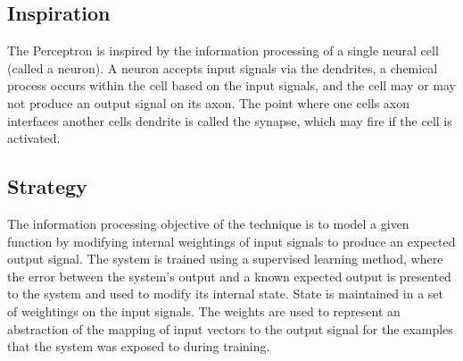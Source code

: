 \subsection{Inspiration}
The Perceptron is inspired by the information processing of a single neural cell (called a neuron). 
A neuron accepts input signals via the dendrites, a chemical process occurs within the cell based on the input signals, and the cell may or may not produce an output signal on its axon. The point where one cells axon interfaces another cells dendrite is called the synapse, which may fire if the cell is activated.


\subsection{Strategy}
The information processing objective of the technique is to model a given function by modifying internal weightings of input signals to produce an expected output signal.
The system is trained using a supervised learning method, where the error between the system's output and a known expected output is presented to the system and used to modify its internal state. State is maintained in a set of weightings on the input signals. The weights are used to represent an abstraction of the mapping of input vectors to the output signal for the examples that the system was exposed to during training.

